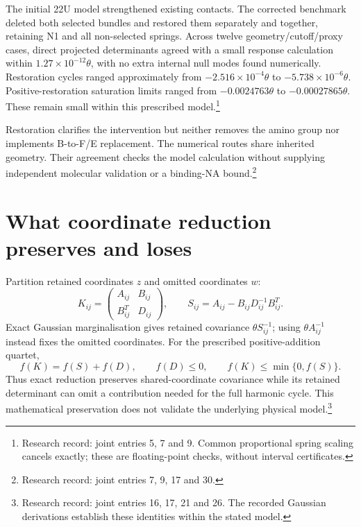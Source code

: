 \documentclass{article}
\begin{document}
The initial 22U model strengthened existing contacts. The corrected benchmark deleted both selected bundles and restored them separately and together, retaining N1 and all non-selected springs. Across twelve geometry/cutoff/proxy cases, direct projected determinants agreed with a small response calculation within \(1.27\times10^{-12}\theta\), with no extra internal null modes found numerically. Restoration cycles ranged approximately from \(-2.516\times10^{-4}\theta\) to \(-5.738\times10^{-6}\theta\). Positive-restoration saturation limits ranged from \(-0.0024763\theta\) to \(-0.00027865\theta\). These remain small within this prescribed model.\footnote{Research record: joint entries 5, 7 and 9. Common proportional spring scaling cancels exactly; these are floating-point checks, without interval certificates.}

Restoration clarifies the intervention but neither removes the amino group nor implements B-to-F/E replacement. The numerical routes share inherited geometry. Their agreement checks the model calculation without supplying independent molecular validation or a binding-NA bound.\footnote{Research record: joint entries 7, 9, 17 and 30.}

\section{What coordinate reduction preserves and loses}
Partition retained coordinates \(z\) and omitted coordinates \(w\):
\[
 K_{ij}=\begin{pmatrix}A_{ij}&B_{ij}\\B_{ij}^T&D_{ij}\end{pmatrix},
 \qquad S_{ij}=A_{ij}-B_{ij}D_{ij}^{-1}B_{ij}^T.
\]
Exact Gaussian marginalisation gives retained covariance \(\theta S_{ij}^{-1}\); using \(\theta A_{ij}^{-1}\) instead fixes the omitted coordinates. For the prescribed positive-addition quartet,
\[
 f(K)=f(S)+f(D),\qquad f(D)\le0,
 \qquad f(K)\le\min\{0,f(S)\}.
\]
Thus exact reduction preserves shared-coordinate covariance while its retained determinant can omit a contribution needed for the full harmonic cycle. This mathematical preservation does not validate the underlying physical model.\footnote{Research record: joint entries 16, 17, 21 and 26. The recorded Gaussian derivations establish these identities within the stated model.}
\end{document}
